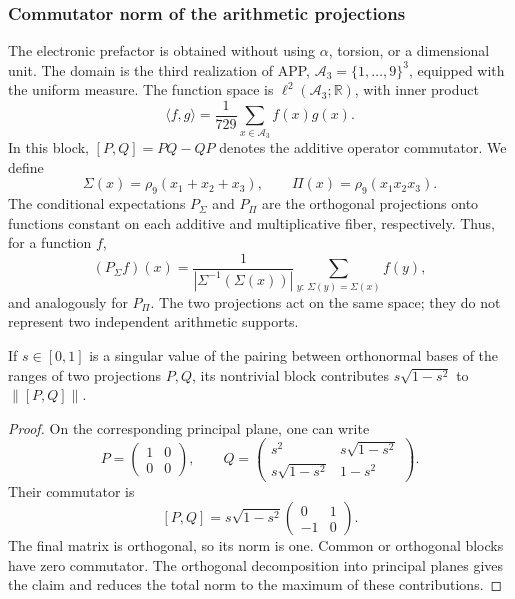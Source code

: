 \subsubsection{Commutator norm of the arithmetic projections}

The electronic prefactor is obtained without using \(\alpha\), torsion,
or a dimensional unit. The domain is the third realization of APP,
\(\mathcal A_3=\{1,\ldots,9\}^3\), equipped with the uniform measure.
The function space is \(\ell^2(\mathcal A_3;\mathbb R)\), with inner
product
\[
 \langle f,g\rangle=\frac1{729}\sum_{x\in\mathcal A_3}f(x)g(x).
\]
In this block, \([P,Q]=PQ-QP\) denotes the additive operator commutator.
We define
\[
 \Sigma(x)=\rho_9(x_1+x_2+x_3),\qquad
 \Pi(x)=\rho_9(x_1x_2x_3).
\]
The conditional expectations \(P_\Sigma\) and \(P_\Pi\) are the
orthogonal projections onto functions constant on each additive
and multiplicative fiber, respectively. Thus, for a function \(f\),
\[
 (P_\Sigma f)(x)
 =\frac{1}{|\Sigma^{-1}(\Sigma(x))|}
   \sum_{y:\,\Sigma(y)=\Sigma(x)}f(y),
\]
and analogously for \(P_\Pi\). The two projections act on the
same space; they do not represent two independent arithmetic supports.

\begin{lemma}
If \(s\in[0,1]\) is a singular value of the pairing between
orthonormal bases of the ranges of two projections \(P,Q\), its nontrivial
block contributes \(s\sqrt{1-s^2}\) to
\(\|[P,Q]\|\).
\end{lemma}
\begin{proof}
On the corresponding principal plane, one can write
\[
 P=\begin{pmatrix}1&0\\0&0\end{pmatrix},\qquad
 Q=\begin{pmatrix}
 s^2&s\sqrt{1-s^2}\\
 s\sqrt{1-s^2}&1-s^2
 \end{pmatrix}.
\]
Their commutator is
\[
 [P,Q]=s\sqrt{1-s^2}
 \begin{pmatrix}0&1\\-1&0\end{pmatrix}.
\]
The final matrix is orthogonal, so its norm is one. Common
or orthogonal blocks have zero commutator. The orthogonal decomposition
into principal planes gives the claim and reduces the total norm to the maximum
of these contributions.
\end{proof}

